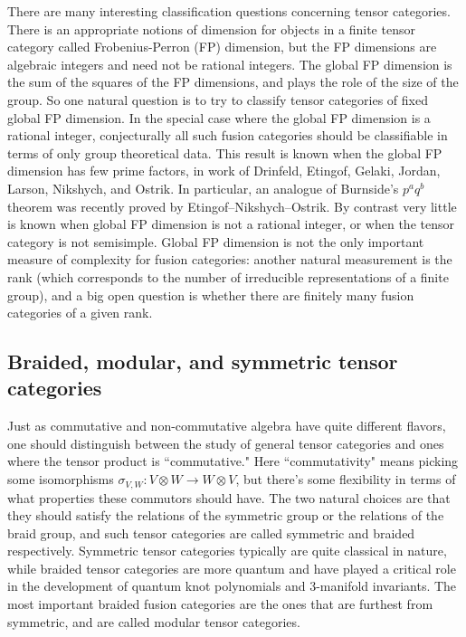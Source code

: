 \documentclass[12pt]{article}
\begin{document}
There are many interesting classification questions concerning tensor categories. There is an appropriate notions of dimension for objects in a finite tensor category called Frobenius-Perron (FP) dimension, but the FP dimensions are algebraic integers and need not be rational integers.  The global FP dimension is the sum of the squares of the FP dimensions, and plays the role of the size of the group. So one natural question is to try to classify tensor categories of fixed global FP dimension.  In the special case where the global FP dimension is a rational integer, conjecturally all such fusion categories should be classifiable in terms of only group theoretical data.  This result is known when the global FP dimension has few prime factors, in work of Drinfeld, Etingof, Gelaki, Jordan, Larson, Nikshych, and Ostrik. In particular, an analogue of Burnside's $p^a q^b$ theorem was recently proved by Etingof--Nikshych--Ostrik. By contrast very little is known when global FP dimension is not a rational integer, or when the tensor category is not semisimple. Global FP dimension is not the only important measure of complexity for fusion categories: another natural measurement is the rank (which corresponds to the number of irreducible representations of a finite group), and a big open question is whether there are finitely many fusion categories of a given rank.


\subsection{Braided, modular, and symmetric tensor categories}
Just as  commutative and non-commutative algebra have quite different flavors, one should distinguish between the study of general tensor categories and ones where the tensor product is ``commutative." Here ``commutativity" means picking some isomorphisms $\sigma_{V,W}: V \otimes W \rightarrow W \otimes V$, but there's some flexibility in terms of what properties these commutors should have. The two natural choices are that they should satisfy the relations of the symmetric group or the relations of the braid group, and such tensor categories are called symmetric and braided respectively. Symmetric tensor categories typically are quite classical in nature, while braided tensor categories are more quantum and have played a critical role in the development of quantum knot polynomials and 3-manifold invariants. The most important braided fusion categories are the ones that are furthest from symmetric, and are called modular tensor categories.
\end{document}
